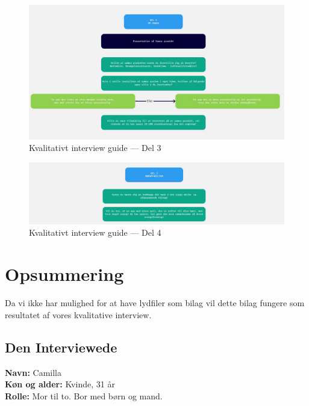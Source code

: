 \begin{figure}
    \centering
    \includegraphics[width=\textwidth]{Images/appendixB/3.jpg}
    \caption{Kvalitativt interview guide — Del 3}
    \label{img:appendixc:3}
\end{figure}

\begin{figure}
    \centering
    \includegraphics[width=\textwidth]{Images/appendixB/4.jpg}
    \caption{Kvalitativt interview guide — Del 4}
    \label{img:appendixc:4}
\end{figure}

\section{Opsummering}
Da vi ikke har mulighed for at have lydfiler som bilag vil dette bilag fungere som resultatet af vores kvalitative interview.

\subsection{Den Interviewede}
\textbf{Navn:} Camilla\\
\textbf{Køn og alder:} Kvinde, 31 år\\
\textbf{Rolle:} Mor til to. Bor med børn og mand.\\

